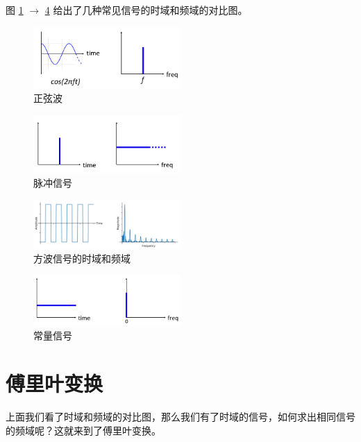 \documentclass[lang=cn,newtx,10pt,scheme=chinese]{elegantbook}
\begin{document}
图 \ref{fig:sine-wave} $\rightarrow$ \ref{fig:dc-signal} 给出了几种常见信号的时域和频域的对比图。

\begin{figure}[!htb]
\centering
\includegraphics[width=0.5\textwidth]{sine-wave.png}
\caption{正弦波}
\label{fig:sine-wave}
\end{figure}

\begin{figure}[!htb]
\centering
\includegraphics[width=0.5\textwidth]{impulse.png}
\caption{脉冲信号}
\label{fig:impulse}
\end{figure}

\begin{figure}[!htb]
\centering
\includegraphics[width=0.5\textwidth]{square-wave.pdf}
\caption{方波信号的时域和频域}
\label{fig:square-wave}
\end{figure}

\begin{figure}[!htb]
\centering
\includegraphics[width=0.5\textwidth]{dc-signal.png}
\caption{常量信号}
\label{fig:dc-signal}
\end{figure}

\section{傅里叶变换}

上面我们看了时域和频域的对比图，那么我们有了时域的信号，如何求出相同信号的频域呢？这就来到了傅里叶变换。
\end{document}

